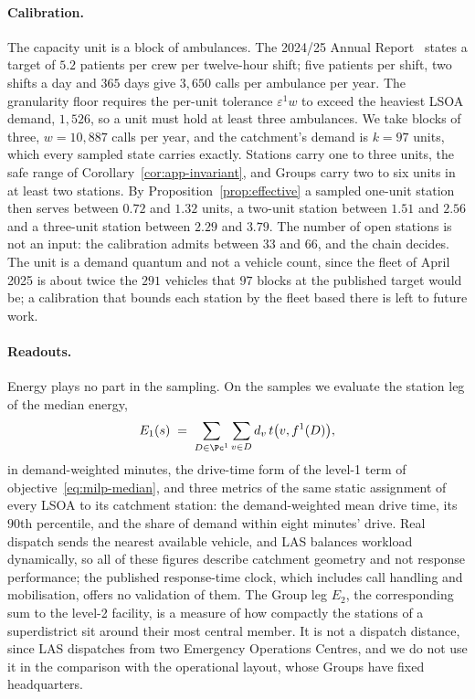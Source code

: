 \paragraph{Calibration.}\label{sec:las-calibration}
The capacity unit is a block of ambulances. The 2024/25 Annual Report~\citep{las_ar_2024_25} states a target of $5.2$ patients per crew per twelve-hour shift; five patients per shift, two shifts a day and $365$ days give $3{,}650$ calls per ambulance per year. The granularity floor requires the per-unit tolerance $\varepsilon^1 w$ to exceed the heaviest LSOA demand, $1{,}526$, so a unit must hold at least three ambulances. We take blocks of three, $w = 10{,}887$ calls per year, and the catchment's demand is $k = 97$ units, which every sampled state carries exactly. Stations carry one to three units, the safe range of Corollary~\ref{cor:app-invariant}, and Groups carry two to six units in at least two stations. By Proposition~\ref{prop:effective} a sampled one-unit station then serves between $0.72$ and $1.32$ units, a two-unit station between $1.51$ and $2.56$ and a three-unit station between $2.29$ and $3.79$. The number of open stations is not an input: the calibration admits between $33$ and $66$, and the chain decides. The unit is a demand quantum and not a vehicle count, since the fleet of April 2025 is about twice the $291$ vehicles that $97$ blocks at the published target would be; a calibration that bounds each station by the fleet based there is left to future work.

\paragraph{Readouts.}
Energy plays no part in the sampling. On the samples we evaluate the station leg of the median energy,
\[
  E_1(s) \;=\; \sum_{D \in \Pc^1} \sum_{v \in D} d_v \, t\bigl(v, f^1(D)\bigr),
\]
in demand-weighted minutes, the drive-time form of the level-1 term of objective~\eqref{eq:milp-median}, and three metrics of the same static assignment of every LSOA to its catchment station: the demand-weighted mean drive time, its $90$th percentile, and the share of demand within eight minutes' drive. Real dispatch sends the nearest available vehicle, and LAS balances workload dynamically, so all of these figures describe catchment geometry and not response performance; the published response-time clock, which includes call handling and mobilisation, offers no validation of them. The Group leg $E_2$, the corresponding sum to the level-2 facility, is a measure of how compactly the stations of a superdistrict sit around their most central member. It is not a dispatch distance, since LAS dispatches from two Emergency Operations Centres, and we do not use it in the comparison with the operational layout, whose Groups have fixed headquarters.

